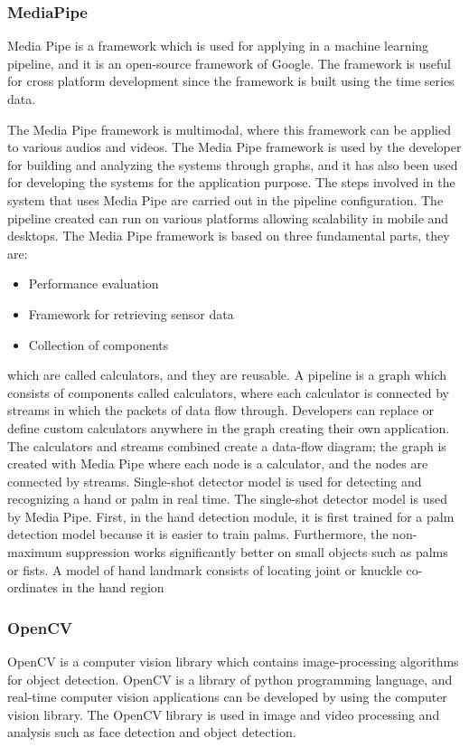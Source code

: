 \documentclass[12pt,a4paper]{report}
\begin{document}
		\subsubsection{MediaPipe}
			{Media Pipe is a framework which is used for applying in a machine learning pipeline, and it is an open-source framework of Google. The framework is useful for cross platform development since the framework is built using the time series data. 

The Media Pipe framework is multimodal, where this framework can be applied to various audios and videos. The Media Pipe framework is used by the developer for building and analyzing the systems through graphs, and it has also been used for developing the systems for the application purpose. The steps involved in the system that uses Media Pipe are carried out in the pipeline configuration. The pipeline created can run on various platforms allowing scalability in mobile and desktops. The Media Pipe framework is based on three fundamental parts, they are:

\begin{itemize}
    \item Performance evaluation 
    \item Framework for retrieving sensor data 
    \item Collection of components
\end{itemize}

which are called calculators, and they are reusable. A pipeline is a graph which consists of components called calculators, where each calculator is connected by streams in which the packets of data flow through. Developers can replace or define custom calculators anywhere in the graph creating their own application. The calculators and streams combined create a data-flow diagram; the graph is created with Media Pipe where each node is a calculator, and the nodes are connected by streams. Single-shot detector model is used for detecting and recognizing a hand or palm in real time. The single-shot detector model is used by Media Pipe. First, in the hand detection module, it is first trained for a palm detection model because it is easier to train palms. Furthermore, the non-maximum suppression works significantly better on small objects such as palms or fists. A model of hand landmark consists of locating joint or knuckle co-ordinates in the hand region }
	\label{OpenCV}
	\subsubsection{OpenCV}
	{
	OpenCV is a computer vision library which contains image-processing algorithms for object detection. OpenCV is a library of python programming language, and real-time computer vision applications can be developed by using the computer vision library. The OpenCV library is used in image and video processing and analysis such as face detection and object detection. 
}	
	\label{PyAutoGUI}
\end{document}
